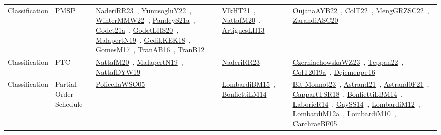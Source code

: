 {\begin{longtable}{lp{3cm}>{\raggedright\arraybackslash}p{6cm}>{\raggedright\arraybackslash}p{6cm}>{\raggedright\arraybackslash}p{8cm}}
\index{PMSP}\index{Classification!PMSP}Classification & PMSP & \href{../works/NaderiRR23.pdf}{NaderiRR23}~\cite{NaderiRR23}, \href{../works/YunusogluY22.pdf}{YunusogluY22}~\cite{YunusogluY22}, \href{../works/WinterMMW22.pdf}{WinterMMW22}~\cite{WinterMMW22}, \href{../works/PandeyS21a.pdf}{PandeyS21a}~\cite{PandeyS21a}, \href{../works/Godet21a.pdf}{Godet21a}~\cite{Godet21a}, \href{../works/GodetLHS20.pdf}{GodetLHS20}~\cite{GodetLHS20}, \href{../works/MalapertN19.pdf}{MalapertN19}~\cite{MalapertN19}, \href{../works/GedikKEK18.pdf}{GedikKEK18}~\cite{GedikKEK18}, \href{../works/GomesM17.pdf}{GomesM17}~\cite{GomesM17}, \href{../works/TranAB16.pdf}{TranAB16}~\cite{TranAB16}, \href{../works/TranB12.pdf}{TranB12}~\cite{TranB12} & \href{../works/VlkHT21.pdf}{VlkHT21}~\cite{VlkHT21}, \href{../works/NattafM20.pdf}{NattafM20}~\cite{NattafM20}, \href{../works/ArtiguesLH13.pdf}{ArtiguesLH13}~\cite{ArtiguesLH13} & \href{../works/OujanaAYB22.pdf}{OujanaAYB22}~\cite{OujanaAYB22}, \href{../works/ColT22.pdf}{ColT22}~\cite{ColT22}, \href{../works/MengGRZSC22.pdf}{MengGRZSC22}~\cite{MengGRZSC22}, \href{../works/ZarandiASC20.pdf}{ZarandiASC20}~\cite{ZarandiASC20}\\
\index{PTC}\index{Classification!PTC}Classification & PTC & \href{../works/NattafM20.pdf}{NattafM20}~\cite{NattafM20}, \href{../works/MalapertN19.pdf}{MalapertN19}~\cite{MalapertN19}, \href{../works/NattafDYW19.pdf}{NattafDYW19}~\cite{NattafDYW19} & \href{../works/NaderiRR23.pdf}{NaderiRR23}~\cite{NaderiRR23} & \href{../works/CzerniachowskaWZ23.pdf}{CzerniachowskaWZ23}~\cite{CzerniachowskaWZ23}, \href{../works/Teppan22.pdf}{Teppan22}~\cite{Teppan22}, \href{../works/ColT2019a.pdf}{ColT2019a}~\cite{ColT2019a}, \href{../works/Dejemeppe16.pdf}{Dejemeppe16}~\cite{Dejemeppe16}\\
\index{Partial Order Schedule}\index{Classification!Partial Order Schedule}Classification & Partial Order Schedule & \href{../works/PolicellaWSO05.pdf}{PolicellaWSO05}~\cite{PolicellaWSO05} & \href{../works/LombardiBM15.pdf}{LombardiBM15}~\cite{LombardiBM15}, \href{../works/BonfiettiLM14.pdf}{BonfiettiLM14}~\cite{BonfiettiLM14} & \href{../works/Bit-Monnot23.pdf}{Bit-Monnot23}~\cite{Bit-Monnot23}, \href{../works/Astrand21.pdf}{Astrand21}~\cite{Astrand21}, \href{../works/Astrand0F21.pdf}{Astrand0F21}~\cite{Astrand0F21}, \href{../works/CappartTSR18.pdf}{CappartTSR18}~\cite{CappartTSR18}, \href{../works/BonfiettiLBM14.pdf}{BonfiettiLBM14}~\cite{BonfiettiLBM14}, \href{../works/LaborieR14.pdf}{LaborieR14}~\cite{LaborieR14}, \href{../works/GaySS14.pdf}{GaySS14}~\cite{GaySS14}, \href{../works/LombardiM12.pdf}{LombardiM12}~\cite{LombardiM12}, \href{../works/LombardiM12a.pdf}{LombardiM12a}~\cite{LombardiM12a}, \href{../works/LombardiM10.pdf}{LombardiM10}~\cite{LombardiM10}, \href{../works/CarchraeBF05.pdf}{CarchraeBF05}~\cite{CarchraeBF05}\\

\end{longtable}}
